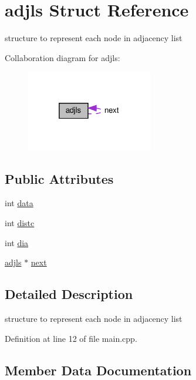 \hypertarget{structadjls}{}\section{adjls Struct Reference}
\label{structadjls}


structure to represent each node in adjacency list  




Collaboration diagram for adjls\+:
\nopagebreak
\begin{figure}[H]
\begin{center}
\leavevmode
\includegraphics[width=157pt]{structadjls__coll__graph}
\end{center}
\end{figure}
\subsection*{Public Attributes}
\begin{DoxyCompactItemize}
\item 
int \hyperlink{structadjls_af69a07e0b1db5778735317a9b50f9caf}{data}
\item 
int \hyperlink{structadjls_a5436743f742db03491ad4b1a0e5a49a8}{distc}
\item 
int \hyperlink{structadjls_a9926ef0452fbfe40ec2d12ab41cf7e54}{dia}
\item 
\hyperlink{structadjls}{adjls} $\ast$ \hyperlink{structadjls_a5887ecb5fe66ccfbbb6748b6cd411259}{next}
\end{DoxyCompactItemize}


\subsection{Detailed Description}
structure to represent each node in adjacency list 

Definition at line 12 of file main.\+cpp.



\subsection{Member Data Documentation}
\mbox{\label{structadjls_af69a07e0b1db5778735317a9b50f9caf}} 

